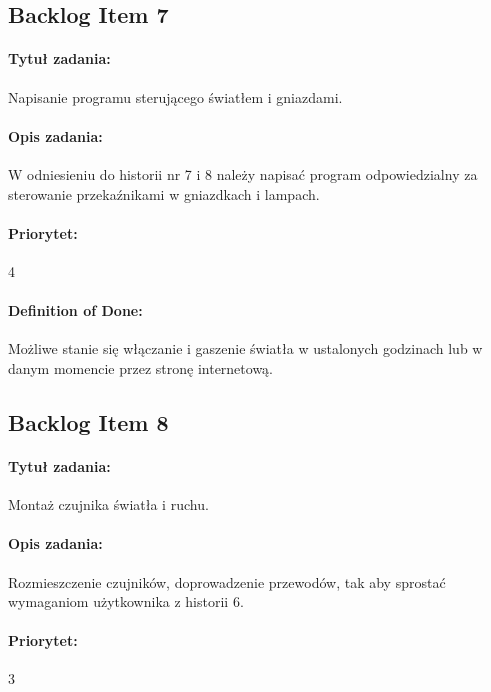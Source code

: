 
	\subsection{Backlog Item 7}
	\paragraph{Tytuł zadania:} 
	Napisanie programu sterującego światłem i gniazdami.
	
	\paragraph{Opis zadania:} 
	W odniesieniu do historii nr 7 i 8 należy napisać program odpowiedzialny za sterowanie przekaźnikami w gniazdkach i lampach.
	
	\paragraph{Priorytet:}
	4
	
	\paragraph{Definition of Done:}
	Możliwe stanie się włączanie i gaszenie światła w ustalonych godzinach lub w danym momencie przez stronę internetową.


	\subsection{Backlog Item 8}
	\paragraph{Tytuł zadania:}
	Montaż czujnika światła i ruchu.
	
	\paragraph{Opis zadania:} 
	Rozmieszczenie czujników, doprowadzenie przewodów, tak aby sprostać wymaganiom użytkownika z historii 6. 
	
	\paragraph{Priorytet:}
	3
	
